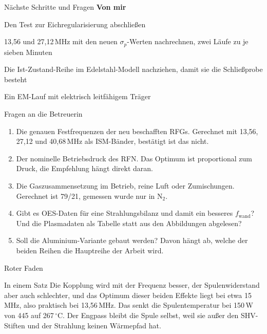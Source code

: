 \documentclass[10pt,aspectratio=169]{beamer}
\makeatletter
\let\jlu@olditemize\itemize
\let\jlu@oldenditemize\enditemize
\renewenvironment{itemize}
  {\jlu@olditemize\setlength{\itemsep}{1pt}\setlength{\parsep}{0pt}\setlength{\topsep}{2pt}}
  {\jlu@oldenditemize}
\makeatother
\begin{document}
\begin{frame}{Nächste Schritte und Fragen}
  \footnotesize
  \textbf{Von mir}
  \begin{itemize}
    \item Den Test zur Eichregularisierung abschließen
    \item 13,56 und 27,12\,MHz mit den neuen $\sigma_p$-Werten nachrechnen, zwei Läufe zu je sieben Minuten
    \item Die Ist-Zustand-Reihe im Edelstahl-Modell nachziehen, damit sie die Schließprobe besteht
    \item Ein EM-Lauf mit elektrisch leitfähigem Träger
  \end{itemize}
  \vspace{0.4em}
  \begin{block}{Fragen an die Betreuerin}
    \scriptsize
    \begin{enumerate}
      \item Die genauen Festfrequenzen der neu beschafften RFGs. Gerechnet mit 13,56, 27,12 und 40,68\,MHz als ISM-Bänder, bestätigt ist das nicht.
      \item Der nominelle Betriebsdruck des RFN. Das Optimum ist proportional zum Druck, die Empfehlung hängt direkt daran.
      \item Die Gaszusammensetzung im Betrieb, reine Luft oder Zumischungen. Gerechnet ist 79/21, gemessen wurde nur in N$_2$.
      \item Gibt es OES-Daten für eine Strahlungsbilanz und damit ein besseres $f_{\text{wand}}$? Und die Plasmadaten als Tabelle statt aus den Abbildungen abgelesen?
      \item Soll die Aluminium-Variante gebaut werden? Davon hängt ab, welche der beiden Reihen die Hauptreihe der Arbeit wird.
    \end{enumerate}
  \end{block}
\end{frame}

\begin{frame}{Roter Faden}
  \vfill
  \begin{block}{In einem Satz}
    \large
    Die Kopplung wird mit der Frequenz besser, der Spulenwiderstand aber
    auch schlechter, und das Optimum dieser beiden Effekte liegt bei etwa
    15\,MHz, also praktisch bei 13,56\,MHz. Das senkt die
    Spulentemperatur bei 150\,W von 445 auf 267\,$^\circ$C. Der Engpass
    bleibt die Spule selbst, weil sie außer den SHV-Stiften und der
    Strahlung keinen Wärmepfad hat.
  \end{block}
  \vfill
\end{frame}
\end{document}
